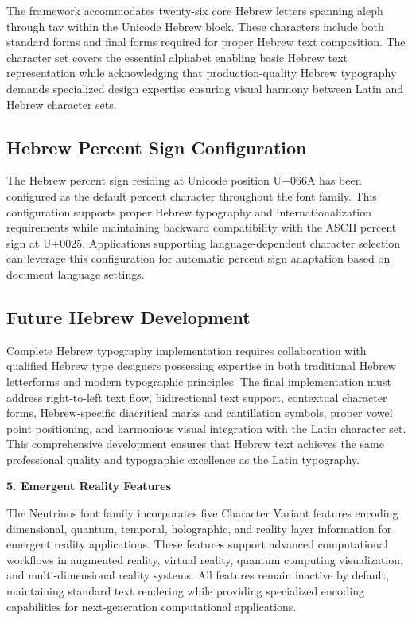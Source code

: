 \documentclass[11pt,letterpaper]{article}
\newcommand{\sectionheader}[1]{%
\vspace{1em}
\noindent
\colorbox{neutrinosblue}{%
\begin{minipage}{\textwidth}
\vspace{0.3em}
{\color{white}\LARGE\textbf{#1}}
\vspace{0.3em}
\end{minipage}}
\vspace{0.5em}
}
\begin{document}
The framework accommodates twenty-six core Hebrew letters spanning aleph through tav within the Unicode Hebrew block. These characters include both standard forms and final forms required for proper Hebrew text composition. The character set covers the essential alphabet enabling basic Hebrew text representation while acknowledging that production-quality Hebrew typography demands specialized design expertise ensuring visual harmony between Latin and Hebrew character sets.

\subsection{Hebrew Percent Sign Configuration}

The Hebrew percent sign residing at Unicode position U+066A has been configured as the default percent character throughout the font family. This configuration supports proper Hebrew typography and internationalization requirements while maintaining backward compatibility with the ASCII percent sign at U+0025. Applications supporting language-dependent character selection can leverage this configuration for automatic percent sign adaptation based on document language settings.

\subsection{Future Hebrew Development}

Complete Hebrew typography implementation requires collaboration with qualified Hebrew type designers possessing expertise in both traditional Hebrew letterforms and modern typographic principles. The final implementation must address right-to-left text flow, bidirectional text support, contextual character forms, Hebrew-specific diacritical marks and cantillation symbols, proper vowel point positioning, and harmonious visual integration with the Latin character set. This comprehensive development ensures that Hebrew text achieves the same professional quality and typographic excellence as the Latin typography.

\newpage

\sectionheader{5. Emergent Reality Features}

The Neutrinos font family incorporates five Character Variant features encoding dimensional, quantum, temporal, holographic, and reality layer information for emergent reality applications. These features support advanced computational workflows in augmented reality, virtual reality, quantum computing visualization, and multi-dimensional reality systems. All features remain inactive by default, maintaining standard text rendering while providing specialized encoding capabilities for next-generation computational applications.
\end{document}
